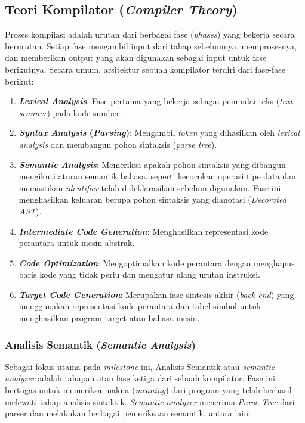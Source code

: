 ﻿\documentclass[12pt,a4paper]{article}
\begin{document}
\subsection{Teori Kompilator (\textit{Compiler Theory})}

Proses kompilasi adalah urutan dari berbagai fase (\textit{phases}) yang bekerja secara berurutan. Setiap fase mengambil input dari tahap sebelumnya, memprosesnya, dan memberikan output yang akan digunakan sebagai input untuk fase berikutnya. Secara umum, arsitektur sebuah kompilator terdiri dari fase-fase berikut:

\begin{enumerate}
    \item \textbf{\textit{Lexical Analysis}}: Fase pertama yang bekerja sebagai
        pemindai teks (\textit{text scanner}) pada kode sumber.
    \item \textbf{\textit{Syntax Analysis} (\textit{Parsing})}: Mengambil
        \textit{token} yang dihasilkan oleh \textit{lexical analysis} dan
        membangun pohon sintaksis (\textit{parse tree}).
    \item \textbf{\textit{Semantic Analysis}}: Memeriksa apakah pohon sintaksis
        yang dibangun mengikuti aturan semantik bahasa, seperti kecocokan
        operasi tipe data dan memastikan \textit{identifier} telah
        dideklarasikan sebelum digunakan. Fase ini menghasilkan keluaran berupa
        pohon sintaksis yang dianotasi (\textit{Decorated AST}).
    \item \textbf{\textit{Intermediate Code Generation}}: Menghasilkan
        representasi kode perantara untuk mesin abstrak.
    \item \textbf{\textit{Code Optimization}}: Mengoptimalkan kode perantara
        dengan menghapus baris kode yang tidak perlu dan mengatur ulang urutan
        instruksi.
    \item \textbf{\textit{Target Code Generation}}: Merupakan fase sintesis
    akhir (\textit{back-end}) yang menggunakan representasi kode perantara dan
    tabel simbol untuk menghasilkan program target atau bahasa mesin.
\end{enumerate}

\subsubsection{Analisis Semantik (\textit{Semantic Analysis})}

Sebagai fokus utama pada \textit{milestone} ini, Analisis Semantik atau
\textit{semantic analyzer} adalah tahapan atau fase ketiga dari sebuah kompilator. Fase ini bertugas untuk memeriksa makna (\textit{meaning}) dari program yang telah berhasil melewati tahap analisis sintaktik. \textit{Semantic analyzer} menerima \textit{Parse Tree} dari parser dan melakukan berbagai pemeriksaan semantik, antara lain:
\end{document}
